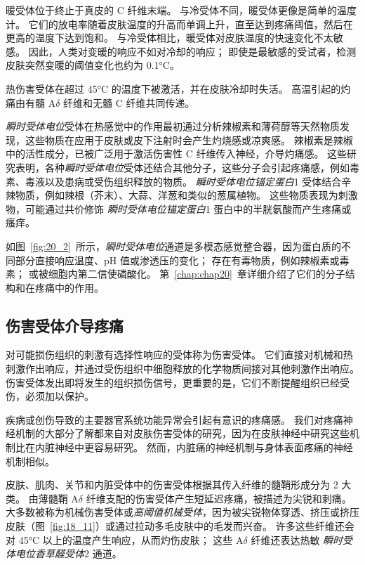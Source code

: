 暖受体位于终止于真皮的 C 纤维末端。
与冷受体不同，暖受体更像是简单的温度计。
它们的放电率随着皮肤温度的升高而单调上升，直至达到疼痛阈值，然后在更高的温度下达到饱和。
与冷受体相比，暖受体对皮肤温度的快速变化不太敏感。
因此，人类对变暖的响应不如对冷却的响应；
即使是最敏感的受试者，检测皮肤突然变暖的阈值变化也约为 0.1°C。


热伤害受体在超过 45°C 的温度下被激活，并在皮肤冷却时失活。
高温引起的灼痛由有髓 A$\delta$ 纤维和无髓 C 纤维共同传递。


\textit{瞬时受体电位}受体在热感觉中的作用最初通过分析辣椒素和薄荷醇等天然物质发现，这些物质在应用于皮肤或皮下注射时会产生灼烧感或凉爽感。
辣椒素是辣椒中的活性成分，已被广泛用于激活伤害性 C 纤维传入神经，介导灼痛感。
这些研究表明，各种\textit{瞬时受体电位}受体还结合其他分子，这些分子会引起疼痛感，例如毒素、毒液以及患病或受伤组织释放的物质。
\textit{瞬时受体电位锚定蛋白}1 受体结合辛辣物质，例如辣根（芥末）、大蒜、洋葱和类似的葱属植物。
这些物质表现为刺激物，可能通过共价修饰 \textit{瞬时受体电位锚定蛋白}1 蛋白中的半胱氨酸而产生疼痛或瘙痒。


如图~\ref{fig:20_2}~所示，\textit{瞬时受体电位}通道是多模态感觉整合器，因为蛋白质的不同部分直接响应温度、pH 值或渗透压的变化；
存在有毒物质，例如辣椒素或毒素；
或被细胞内第二信使磷酸化。
第~\ref{chap:chap20}~章详细介绍了它们的分子结构和在疼痛中的作用。



\subsection{伤害受体介导疼痛}

对可能损伤组织的刺激有选择性响应的受体称为伤害受体。
它们直接对机械和热刺激作出响应，并通过受伤组织中细胞释放的化学物质间接对其他刺激作出响应。
伤害受体发出即将发生的组织损伤信号，更重要的是，它们不断提醒组织已经受伤，必须加以保护。


疾病或创伤导致的主要器官系统功能异常会引起有意识的疼痛感。
我们对疼痛神经机制的大部分了解都来自对皮肤伤害受体的研究，因为在皮肤神经中研究这些机制比在内脏神经中更容易研究。
然而，内脏痛的神经机制与身体表面疼痛的神经机制相似。


皮肤、肌肉、关节和内脏受体中的伤害受体根据其传入纤维的髓鞘形成分为 2 大类。
由薄髓鞘 A$\delta$ 纤维支配的伤害受体产生短延迟疼痛，被描述为尖锐和刺痛。
大多数被称为机械伤害受体或\textit{高阈值机械受体}，因为被尖锐物体穿透、挤压或挤压皮肤（图~\ref{fig:18_11}）或通过拉动多毛皮肤中的毛发而兴奋。
许多这些纤维还会对 45°C 以上的温度产生响应，从而灼伤皮肤；
这些 A$\delta$ 纤维还表达热敏 \textit{瞬时受体电位香草醛受体}2 通道。


